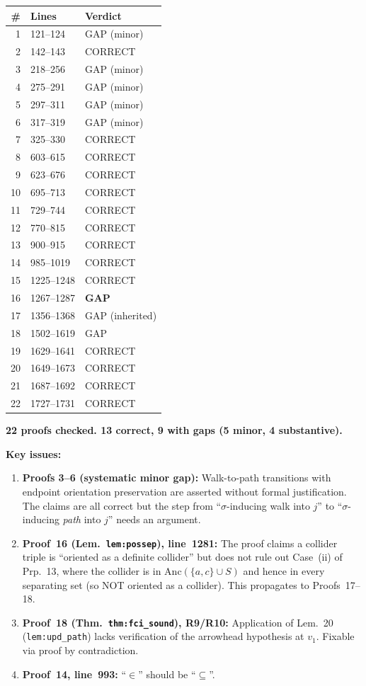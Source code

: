\documentclass{article}
\begin{document}
\begin{center}
\begin{tabular}{r|l|l}
\textbf{\#} & \textbf{Lines} & \textbf{Verdict} \\ \hline
1  & 121--124    & GAP (minor) \\
2  & 142--143    & CORRECT \\
3  & 218--256    & GAP (minor) \\
4  & 275--291    & GAP (minor) \\
5  & 297--311    & GAP (minor) \\
6  & 317--319    & GAP (minor) \\
7  & 325--330    & CORRECT \\
8  & 603--615    & CORRECT \\
9  & 623--676    & CORRECT \\
10 & 695--713    & CORRECT \\
11 & 729--744    & CORRECT \\
12 & 770--815    & CORRECT \\
13 & 900--915    & CORRECT \\
14 & 985--1019   & CORRECT \\
15 & 1225--1248  & CORRECT \\
16 & 1267--1287  & \textbf{GAP} \\
17 & 1356--1368  & GAP (inherited) \\
18 & 1502--1619  & GAP \\
19 & 1629--1641  & CORRECT \\
20 & 1649--1673  & CORRECT \\
21 & 1687--1692  & CORRECT \\
22 & 1727--1731  & CORRECT \\
\end{tabular}
\end{center}

\textbf{22 proofs checked.  13 correct, 9 with gaps (5 minor, 4 substantive).}

\bigskip\noindent
\textbf{Key issues:}
\begin{enumerate}
  \item \textbf{Proofs 3--6 (systematic minor gap):}
    Walk-to-path transitions with endpoint orientation preservation are
    asserted without formal justification.  The claims are all correct
    but the step from ``$\sigma$-inducing walk into $j$'' to
    ``$\sigma$-inducing \emph{path} into $j$'' needs an argument.
  \item \textbf{Proof~16 (Lem.\ \texttt{lem:possep}), line~1281:}
    The proof claims a collider triple is ``oriented as a definite collider''
    but does not rule out Case~(ii) of Prp.~13, where the collider is in
    $\mathrm{Anc}(\{a,c\}\cup S)$ and hence in every separating set (so NOT
    oriented as a collider).  This propagates to Proofs~17--18.
  \item \textbf{Proof~18 (Thm.\ \texttt{thm:fci\_sound}), R9/R10:}
    Application of Lem.~20 (\texttt{lem:upd\_path}) lacks verification of the
    arrowhead hypothesis at $v_1$.  Fixable via proof by contradiction.
  \item \textbf{Proof~14, line~993:} ``$\in$'' should be ``$\subseteq$''.
\end{enumerate}
\end{document}
